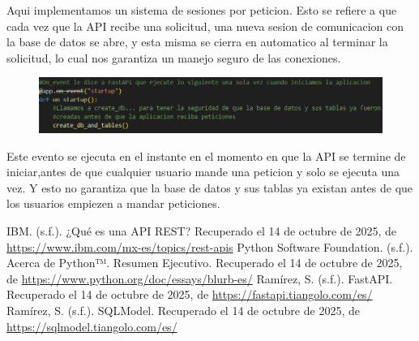 \documentclass[12pt]{article}
\begin{document}
Aqui implementamos un sistema de sesiones por peticion. Esto se refiere a que cada vez que la API recibe una solicitud, una nueva sesion de comunicacion con la base de datos
se abre, y esta misma se cierra en automatico al terminar la solicitud, lo cual nos garantiza un manejo seguro de las conexiones.

\begin{figure}[H]
    \centering
    \includegraphics[width=1\textwidth]{Imagenes/Imagen WEB 3_7.png}
\end{figure}

Este evento se ejecuta en el instante en el momento en que la API se termine de iniciar,antes de que cualquier usuario mande una peticion y solo se ejecuta una vez.
Y esto no garantiza que la base de datos y sus tablas ya existan antes de que los usuarios empiezen a mandar peticiones.

\newpage %

\begin{thebibliography}{99}

     IBM. (s.f.). ¿Qué es una API REST? Recuperado el 14 de octubre de 2025, de \url{https://www.ibm.com/mx-es/topics/rest-apis}
     Python Software Foundation. (s.f.). Acerca de Python™. Resumen Ejecutivo. Recuperado el 14 de octubre de 2025, de \url{https://www.python.org/doc/essays/blurb-es/}
     Ramírez, S. (s.f.). FastAPI. Recuperado el 14 de octubre de 2025, de \url{https://fastapi.tiangolo.com/es/}
     Ramírez, S. (s.f.). SQLModel. Recuperado el 14 de octubre de 2025, de \url{https://sqlmodel.tiangolo.com/es/}

\end{thebibliography}
\end{document}
